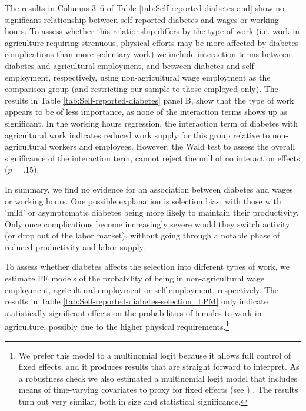 \documentclass[12pt,english]{article}
\begin{document}
The results in Columns 3--6 of Table \ref{tab:Self-reported-diabetes-and} show no significant relationship between self-reported diabetes and wages or working hours. To assess whether this relationship differs by the type of work (i.e. work in agriculture requiring strenuous, physical efforts may be more affected by diabetes complications than more sedentary work) we include interaction terms between diabetes and agricultural employment, and between diabetes and self-employment, respectively, using non-agricultural wage employment as the comparison group (and restricting our sample to those employed only). The results in Table \ref{tab:Self-reported-diabetes} panel B, show that the type of work appears to be of less importance, as none of the interaction terms shows up as significant. In the working hours regression, the interaction term of diabetes with agricultural work indicates reduced work supply for this group relative to non-agricultural workers and employees. However, the Wald test to assess the overall significance of the interaction term, cannot  reject the null of no interaction effects ($p = .15$).

In summary, we find no evidence for an association between diabetes and wages or working hours. One possible explanation is selection bias, with those with 'mild' or asymptomatic diabetes being more likely to maintain their productivity. Only once complications become increasingly severe would they switch activity (or drop out of the labor market), without going through a notable phase of reduced productivity and labor supply.

To assess whether diabetes affects the selection into different types of work, we estimate \ac{FE} models of the probability of being in non-agricultural wage employment, agricultural employment or self-employment, respectively. The results in Table \ref{tab:Self-reported-diabetes-selection_LPM} only indicate statistically significant effects on the probabilities of females to work in agriculture, possibly due to the higher physical requirements.\footnote{We prefer this model to a multinomial logit because it allows full control of fixed effects, and it produces results that are straight forward to interpret. As a robustness check we also estimated a multinomial logit model that includes means of time-varying covariates to proxy for fixed effects (see \textcite{Mundlak1978,Bell2015}) \parencite{Bell2015}. The results turn out very similar, both in size and statistical significance.}
\end{document}
